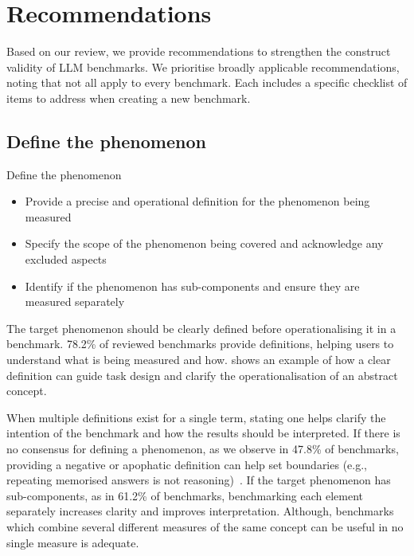 \section{Recommendations}
Based on our review, we provide recommendations to strengthen the construct validity of LLM benchmarks. We prioritise broadly applicable recommendations, noting that not all apply to every benchmark. Each includes a specific checklist of items to address when creating a new benchmark.

\subsection{Define the phenomenon}

\begin{checklistbox}{Define the phenomenon}
    \begin{itemize}[leftmargin=5pt, label=\scriptsize$\square$]
        \item Provide a precise and operational definition for the phenomenon being measured
        \item Specify the scope of the phenomenon being covered and acknowledge any excluded aspects
        \item Identify if the phenomenon has sub-components and ensure they are measured separately
    \end{itemize}
\end{checklistbox}

The target phenomenon should be clearly defined before operationalising it in a benchmark. 78.2\% of reviewed benchmarks provide definitions, helping users to understand what is being measured and how. \textcite{phuongEvaluatingFrontierModels2024a} shows an example of how a clear definition can guide task design and clarify the operationalisation of an abstract concept.

When multiple definitions exist for a single term, stating one helps clarify the intention of the benchmark and how the results should be interpreted. If there is no consensus for defining a phenomenon, as we observe in 47.8\% of benchmarks, providing a negative or apophatic definition can help set boundaries (e.g., repeating memorised answers is not reasoning)~\cite{beanLINGOLYBenchmarkOlympiadlevel2024a}. If the target phenomenon has sub-components, as in 61.2\% of benchmarks, benchmarking each element separately increases clarity and improves interpretation. Although, benchmarks which combine several different measures of the same concept can be useful in no single measure is adequate.

